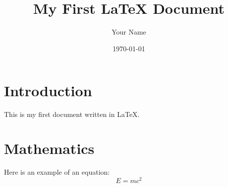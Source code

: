 \documentclass{article}
\begin{document}
	
	\title{My First LaTeX Document}
	\author{Your Name}
	\date{\today}
	\maketitle
	
	\section{Introduction}
	
	This is my first document written in \LaTeX.
	
	\section{Mathematics}
	
	Here is an example of an equation:
	\begin{equation}
		E = mc^2
	\end{equation}
	
\end{document}
